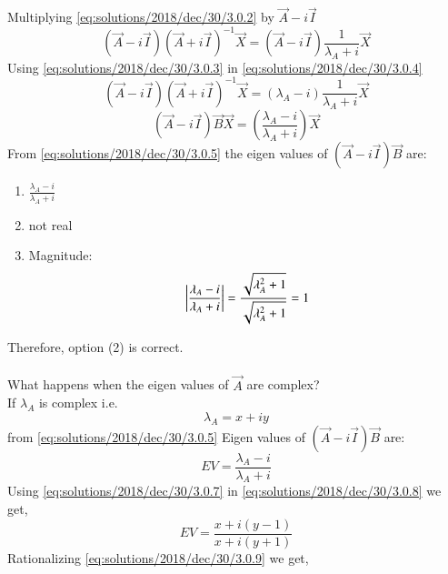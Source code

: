  Multiplying \eqref{eq:solutions/2018/dec/30/3.0.2} by $\vec{A}-i\vec{I}$
 \begin{equation}\label{eq:solutions/2018/dec/30/3.0.4}
 (\vec{A}-i\vec{I})(\vec{A}+i\vec{I})^{-1} \vec{X} = (\vec{A}-i\vec{I})  \frac{1}{\lambda_A+i} \vec{X}
 \end{equation}
 Using \eqref{eq:solutions/2018/dec/30/3.0.3} in \eqref{eq:solutions/2018/dec/30/3.0.4}
 \begin{equation*}
 (\vec{A}-i\vec{I})(\vec{A}+i\vec{I})^{-1} \vec{X} = (\lambda_A-i) \frac{1}{\lambda_A+i} \vec{X}
 \end{equation*}
 \begin{equation} \label{eq:solutions/2018/dec/30/3.0.5}
 (\vec{A}-i\vec{I})\vec{B} \vec{X} = \left(\frac{\lambda_A-i}{\lambda_A+i}\right) \vec{X}
 \end{equation}
 From \eqref{eq:solutions/2018/dec/30/3.0.5} the eigen values of $(\vec{A}-i\vec{I})\vec{B}$ are:
 \begin{enumerate}
 \item $\frac{\lambda_A-i}{\lambda_A+i}$
 \item not real 
 \item Magnitude:
 \begin{equation}
 \left| \frac{\lambda_A-i}{\lambda_A+i} \right| = \frac{\sqrt{\lambda_A^2+1}}{\sqrt{\lambda_A^2+1}}\\ = 1
 \end{equation}
 \end{enumerate}
 Therefore, option (2) is correct.\\
 \\
 What happens when the eigen values of $\vec{A}$ are complex?\\
 If $\lambda_A$ is complex i.e.
 \begin{equation}\label{eq:solutions/2018/dec/30/3.0.7}
 \lambda_A = x + iy
 \end{equation}
 from \eqref{eq:solutions/2018/dec/30/3.0.5} Eigen values of $(\vec{A}-i\vec{I})\vec{B}$ are:\\
 \begin{equation}\label{eq:solutions/2018/dec/30/3.0.8}
 EV = \frac{\lambda_A-i}{\lambda_A+i}
 \end{equation}
 Using \eqref{eq:solutions/2018/dec/30/3.0.7} in \eqref{eq:solutions/2018/dec/30/3.0.8} we get,
 \begin{equation}\label{eq:solutions/2018/dec/30/3.0.9}
 EV = \frac{x+i(y-1)}{x+i(y+1)}
 \end{equation}
 Rationalizing \eqref{eq:solutions/2018/dec/30/3.0.9} we get,
